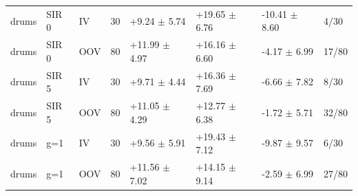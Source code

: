 \begin{tabular}{llllllll}
drums & SIR 0 & IV & 30 & +9.24 $\pm$ 5.74 & +19.65 $\pm$ 6.76 & -10.41 $\pm$ 8.60 & 4/30\\
drums & SIR 0 & OOV & 80 & +11.99 $\pm$ 4.97 & +16.16 $\pm$ 6.60 & -4.17 $\pm$ 6.99 & 17/80\\
drums & SIR 5 & IV & 30 & +9.71 $\pm$ 4.44 & +16.36 $\pm$ 7.69 & -6.66 $\pm$ 7.82 & 8/30\\
drums & SIR 5 & OOV & 80 & +11.05 $\pm$ 4.29 & +12.77 $\pm$ 6.38 & -1.72 $\pm$ 5.71 & 32/80\\
drums & g=1 & IV & 30 & +9.56 $\pm$ 5.91 & +19.43 $\pm$ 7.12 & -9.87 $\pm$ 9.57 & 6/30\\
drums & g=1 & OOV & 80 & +11.56 $\pm$ 7.02 & +14.15 $\pm$ 9.14 & -2.59 $\pm$ 6.99 & 27/80\\
\bottomrule
\end{tabular}
